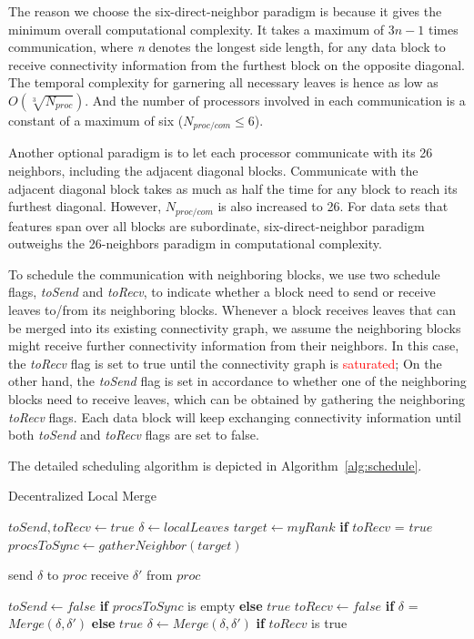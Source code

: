 \documentclass[10pt, conference, compsocconf]{IEEEtran}
\begin{document}
The reason we choose the six-direct-neighbor paradigm is because it gives the minimum overall computational complexity. It takes a maximum of ${3n-1}$ times communication, where \emph{n} denotes the longest side length, for any data block to receive connectivity information from the furthest block on the opposite diagonal. The temporal complexity for garnering all necessary leaves is hence as low as ${O(\sqrt[3]{N_{proc}})}$. And the number of processors involved in each communication is a constant of a maximum of six ($N_{proc/com} \leq 6$). 

Another optional paradigm is to let each processor communicate with its 26 neighbors, including the adjacent diagonal blocks. Communicate with the adjacent diagonal block takes as much as half the time for any block to reach its furthest diagonal. However, $N_{proc/com}$  is also increased to 26. For data sets that features span over all blocks are subordinate, six-direct-neighbor paradigm outweighs the 26-neighbors paradigm in computational complexity.

To schedule the communication with neighboring blocks, we use two schedule flags, \emph{toSend} and \emph{toRecv}, to indicate whether a block need to send or receive leaves to/from its neighboring blocks. Whenever a block receives leaves that can be merged into its existing connectivity graph, we assume the neighboring blocks might receive further connectivity information from their neighbors. In this case, the \emph{toRecv} flag is set to true until the connectivity graph is \textcolor{red}{saturated}; On the other hand, the \emph{toSend} flag is set in accordance to whether one of the neighboring blocks need to receive leaves, which can be obtained by gathering the neighboring \emph{toRecv} flags. Each data block will keep exchanging connectivity information until both \emph{toSend} and \emph{toRecv} flags are set to false. 

The detailed scheduling algorithm is depicted in Algorithm~\ref{alg:schedule}.
\begin{algorithm}
\caption{Decentralized Local Merge}
\label{alg:schedule}
	\begin{algorithmic}
	\STATE $toSend, toRecv \leftarrow true$
	\STATE $\delta \leftarrow localLeaves$
		\STATE $target \leftarrow myRank$ \textbf{if} $toRecv$ = $true$
		\STATE $procsToSync \leftarrow gatherNeighbor(target)$
		
				\STATE send $\delta$ to $proc$
			\ENDIF
				\STATE receive $\delta\prime$ from $proc$
			\ENDIF
		\ENDFOR
		
		\STATE $toSend \leftarrow false$ \textbf{if} $procsToSync$ is empty \textbf{else} $true$
		\STATE $toRecv \leftarrow false$ \textbf{if} $\delta$ = $Merge(\delta, \delta\prime)$ \textbf{else} $true$
		\STATE $\delta \leftarrow Merge(\delta, \delta\prime)$ \textbf{if} $toRecv$ is true
  \ENDWHILE
  \end{algorithmic}
\end{algorithm}
\end{document}
